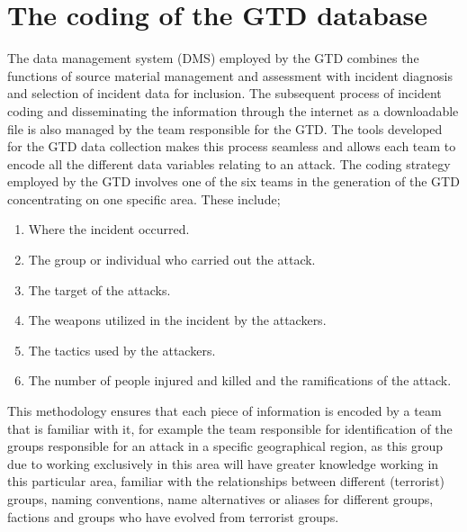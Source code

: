 \section{The coding of the GTD database}
The data management system (DMS) employed by the GTD combines the functions of source material management and assessment with incident diagnosis and selection of incident data for inclusion. The subsequent process of incident coding and disseminating the information through the internet as a downloadable file is also managed by the team responsible for the GTD. The tools developed for the GTD data collection makes this process seamless and allows each team to encode all the different data variables relating to an attack. The coding strategy employed by the GTD involves one of the six teams in the generation of the GTD concentrating on one specific area. These include;
\begin{enumerate}
 \item Where the incident occurred.
 \item  The group or individual who carried out the attack.
 \item The target of the attacks.
 \item The weapons utilized in the incident by the attackers.
 \item The tactics used by the attackers.
 \item The number of people injured and killed and the ramifications of the attack.
 \end{enumerate} 
This methodology ensures that each piece of information is encoded by a team that is familiar with it, for example the team responsible for identification of the groups responsible for an attack in a specific geographical region,  as this group due to working exclusively in this area will have greater knowledge working in this particular area, familiar with the relationships between different (terrorist) groups, naming conventions, name alternatives or aliases for different groups, factions and groups who have evolved from terrorist groups.
